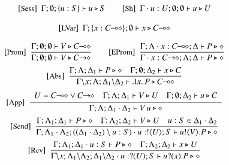 

\begin{figure}[t!]
\[
	\begin{array}{c}
		\trule{Sess}~~\Gamma; \emptyset; \set{u:S} \proves u \hastype S 
		\qquad
		\trule{Sh}~~\Gamma \cat u : U; \emptyset; \emptyset \proves u \hastype U
		\\[4mm]
		\trule{LVar}~~\Gamma; \set{x: \lhot{C}}; \emptyset \proves x \hastype \lhot{C}
		\\[4mm]

		\trule{Prom}~~\tree{
			\Gamma; \emptyset; \emptyset \proves V \hastype 
                         \lhot{C}
		}{
			\Gamma; \emptyset; \emptyset \proves V \hastype 
                         \shot{C}
		} 
		\qquad
		\trule{EProm}~~\tree{
		\Gamma; \Lambda \cat x : \lhot{C}; \Delta \proves P \hastype \Proc
		}{
			\Gamma \cat x:\shot{C}; \Lambda; \Delta \proves P \hastype \Proc
		}
		\\[4mm]

		\trule{Abs}~~\tree{
			\Gamma; \Lambda; \Delta_1 \proves P \hastype \Proc
			\quad
			\Gamma; \es; \Delta_2 \proves x \hastype C
		}{
			\Gamma\backslash x; \Lambda; \Delta_1 \backslash \Delta_2 \proves \abs{{x}}{P} \hastype \lhot{{C}}
		}
		\\[4mm]

		\trule{App}~~\tree{
			\begin{array}{c}
				U = \lhot{C} \lor \shot{C}
				\quad
				\Gamma; \Lambda; \Delta_1 \proves V \hastype U
				\quad
				\Gamma; \es; \Delta_2 \proves u \hastype C
			\end{array}
		}{
			\Gamma; \Lambda; \Delta_1 \cat \Delta_2 \proves \appl{V}{u} \hastype \Proc
		} 
		\\[4mm]

		\trule{Send}~~\tree{
			\Gamma; \Lambda_1; \Delta_1 \proves P \hastype \Proc
			\quad
			\Gamma; \Lambda_2; \Delta_2 \proves V \hastype U
			\quad
			u:S \in \Delta_1 \cat \Delta_2
		}{
			\Gamma; \Lambda_1 \cat \Lambda_2; ((\Delta_1 \cat \Delta_2) \setminus u:S) \cat u:\btout{U} S \proves \bout{u}{V} P \hastype \Proc
		}
		\\[4mm]

		\trule{Rcv}~~\tree{
			\Gamma; \Lambda_1; \Delta_1 \cat u: S \proves P \hastype \Proc
			\quad
			\Gamma; \Lambda_2; \Delta_2 \proves {x} \hastype {U}
		}{
			\Gamma \backslash x; \Lambda_1\backslash \Lambda_2; \Delta_1\backslash \Delta_2 \cat u: \btinp{U} S \vdash \binp{u}{{x}} P \hastype \Proc
		}
		\\[4mm]


\end{array}\]
\end{figure}
